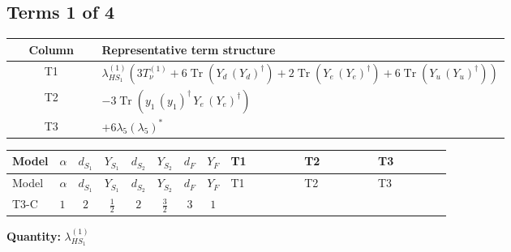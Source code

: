 \documentclass[8pt]{article}
\begin{document}
\begin{landscape}
\subsection*{Terms 1 of 4}
\begin{center}
\begin{tabular}{@{}c >{\raggedright\arraybackslash}p{0.82\linewidth}@{}}
\toprule
Column & Representative term structure \\
\midrule
T1 & \(\displaystyle {\lambda_{HS_1}^{(1)}} (3 T_{\nu}^{(1)}+6 \operatorname{Tr}\!\left({Y_d}\,\left({Y_d}\right)^{\dagger}\right)+2 \operatorname{Tr}\!\left({Y_e}\,\left({Y_e}\right)^{\dagger}\right)+6 \operatorname{Tr}\!\left({Y_u}\,\left({Y_u}\right)^{\dagger}\right))\) \\
\midrule
T2 & \(\displaystyle -3 \operatorname{Tr}\!\left({y_1}\,\left({y_1}\right)^{\dagger}\,{Y_e}\,\left({Y_e}\right)^{\dagger}\right)\) \\
\midrule
T3 & \(\displaystyle +6 {\lambda_5} \left({\lambda_5}\right)^{*}\) \\
\midrule
\bottomrule
\end{tabular}
\end{center}
\smallskip
\tiny
\begin{longtable}{@{}llcccccc >{\raggedright\arraybackslash}p{0.21\linewidth} >{\raggedright\arraybackslash}p{0.21\linewidth} >{\raggedright\arraybackslash}p{0.21\linewidth}@{}}
\toprule
Model & $\alpha$ & $d_{S_1}$ & $Y_{S_1}$ & $d_{S_2}$ & $Y_{S_2}$ & $d_F$ & $Y_F$ & T1 & T2 & T3 \\
\midrule
\endfirsthead
\toprule
Model & $\alpha$ & $d_{S_1}$ & $Y_{S_1}$ & $d_{S_2}$ & $Y_{S_2}$ & $d_F$ & $Y_F$ & T1 & T2 & T3 \\
\midrule
\endhead
T3-C & $1$ & $2$ & $\frac{1}{2}$ & $2$ & $\frac{3}{2}$ & $3$ & $1$ & \scriptsize\adjustbox{max width=\linewidth}{$\begin{gathered} {\lambda_{HS_1}^{(1)}} (3 T_{\nu}^{(1)}+6 \operatorname{Tr}\!\left({Y_d}\,\left({Y_d}\right)^{\dagger}\right)+2 \operatorname{Tr}\!\left({Y_e}\,\left({Y_e}\right)^{\dagger}\right)+6 \operatorname{Tr}\!\left({Y_u}\,\left({Y_u}\right)^{\dagger}\right))\end{gathered}$} & \scriptsize\adjustbox{max width=\linewidth}{$\begin{gathered} -3 \operatorname{Tr}\!\left({y_1}\,\left({y_1}\right)^{\dagger}\,{Y_e}\,\left({Y_e}\right)^{\dagger}\right)\end{gathered}$} & \scriptsize\adjustbox{max width=\linewidth}{$\begin{gathered} +6 {\lambda_5} \left({\lambda_5}\right)^{*}\end{gathered}$} \\
\midrule
\bottomrule
\end{longtable}
\clearpage
\noindent\textbf{Quantity: }$\lambda_{HS_1}^{(1)}$\par\smallskip

\end{landscape}
\end{document}
